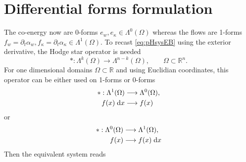 \documentclass{article}
\begin{document}
\section{Differential forms formulation}

The co-energy now are 0-forms $e_w, e_\kappa \in \Lambda^0(\Omega)$ whereas the flows are 1-forms $f_w= \partial_t \alpha_w, f_\kappa= \partial_t \alpha_\kappa \in \Lambda^1(\Omega)$. To recast \eqref{eq:pHsysEB} using the exterior derivative, the Hodge star operator is needed
\begin{equation}
	*: \Lambda^k(\Omega) \rightarrow \Lambda^{n-k}(\Omega), \qquad \Omega \subset \mathbb{R}^n.
\end{equation}
For one dimensional domains $\Omega \subset \mathbb{R}$ and using Euclidian coordinates, this operator can be either used on 1-forms or 0-forms
\begin{equation}
\begin{aligned}
*: \Lambda^1(\Omega) &\longrightarrow \Lambda^0(\Omega), \\
 f(x)\d{x} &\longrightarrow f(x)
\end{aligned}
\end{equation}
 or 
\begin{equation}
\begin{aligned}
*: \Lambda^0(\Omega) &\longrightarrow \Lambda^1(\Omega), \\
f(x) &\longrightarrow f(x)\d{x}
\end{aligned}
\end{equation}
Then the equivalent system reads 
\end{document}
